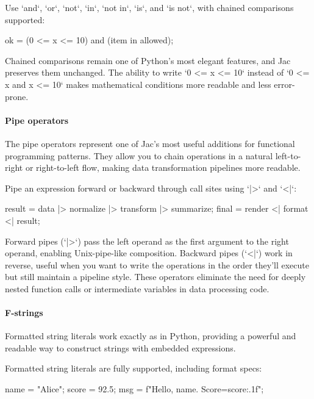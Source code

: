 Use `and`, `or`, `not`, `in`, `not in`, `is`, and `is not`, with chained comparisons supported:

\begin{jacblock}
ok = (0 <= x <= 10) and (item in allowed);
\end{jacblock}

Chained comparisons remain one of Python's most elegant features, and Jac preserves them unchanged. The ability to write `0 <= x <= 10` instead of `0 <= x and x <= 10` makes mathematical conditions more readable and less error-prone.

\paragraph{Pipe operators}

The pipe operators represent one of Jac's most useful additions for functional programming patterns. They allow you to chain operations in a natural left-to-right or right-to-left flow, making data transformation pipelines more readable.

Pipe an expression forward or backward through call sites using `|>` and `<|`:

\begin{jacblock}
result = data |> normalize |> transform |> summarize;
final  = render <| format <| result;
\end{jacblock}

Forward pipes (`|>`) pass the left operand as the first argument to the right operand, enabling Unix-pipe-like composition. Backward pipes (`<|`) work in reverse, useful when you want to write the operations in the order they'll execute but still maintain a pipeline style. These operators eliminate the need for deeply nested function calls or intermediate variables in data processing code.

\paragraph{F-strings}

Formatted string literals work exactly as in Python, providing a powerful and readable way to construct strings with embedded expressions.

Formatted string literals are fully supported, including format specs:

\begin{jacblock}
name = "Alice"; score = 92.5;
msg = f"Hello, {name}. Score={score:.1f}";
\end{jacblock}

